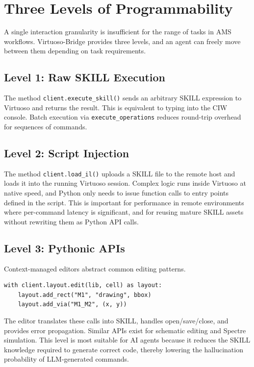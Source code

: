 \documentclass[lettersize,journal]{ieee_template/IEEEtran}
\begin{document}
\section{Three Levels of Programmability}

A single interaction granularity is insufficient for the range of tasks in AMS workflows. Virtuoso-Bridge provides three levels, and an agent can freely move between them depending on task requirements.

\subsection{Level 1: Raw SKILL Execution}
The method \texttt{client.execute\_skill()} sends an arbitrary SKILL expression to Virtuoso and returns the result. This is equivalent to typing into the CIW console. Batch execution via \texttt{execute\_operations} reduces round-trip overhead for sequences of commands.

\subsection{Level 2: Script Injection}
The method \texttt{client.load\_il()} uploads a SKILL file to the remote host and loads it into the running Virtuoso session. Complex logic runs inside Virtuoso at native speed, and Python only needs to issue function calls to entry points defined in the script. This is important for performance in remote environments where per-command latency is significant, and for reusing mature SKILL assets without rewriting them as Python API calls.

\subsection{Level 3: Pythonic APIs}
Context-managed editors abstract common editing patterns.

\begin{verbatim}
with client.layout.edit(lib, cell) as layout:
    layout.add_rect("M1", "drawing", bbox)
    layout.add_via("M1_M2", (x, y))
\end{verbatim}

The editor translates these calls into SKILL, handles open/save/close, and provides error propagation. Similar APIs exist for schematic editing and Spectre simulation. This level is most suitable for AI agents because it reduces the SKILL knowledge required to generate correct code, thereby lowering the hallucination probability of LLM-generated commands.
\end{document}
